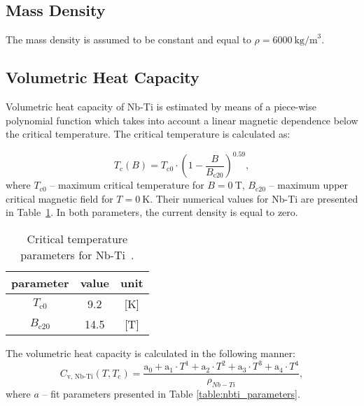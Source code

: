 
\subsection{Mass Density}
The mass density is assumed to be constant and equal to $\rho = 6000~\text{kg/m}^{3}$.

\subsection{Volumetric Heat Capacity}
Volumetric heat capacity of Nb-Ti is estimated by means of a piece-wise polynomial function which takes into account a linear magnetic dependence below the critical temperature. The critical temperature is calculated as: 

\begin{equation}
    T_\text{c}(B) = T_\text{c0}\cdot(1-\frac{B}{B_\text{c20}})^{0.59},
\end{equation}
where $T_\text{c0}$ -- maximum critical temperature for $B=0~\text{T}$, $B_\text{c20}$ -- maximum upper critical magnetic field for $T=0~\text{K}$. Their numerical values for Nb-Ti are presented in Table~\ref{table: appendix_nb_ti_crit_temp_params}. In both parameters, the current density is equal to zero. 

\newpage
\begin{table}[H]
    \caption{Critical temperature parameters for Nb-Ti~\cite{empirical_scaling_formulas_for_critical_current}.} 
    \vspace{-1.em} 
    \fontsize{10}{10}
    \selectfont 
    \renewcommand{\arraystretch}{1.5}
    \begin{center}
        \begin{tabular}{ ccc }  
        \hline
        parameter & value & unit \\
        \hline
        $T_\text{c0}$ & 9.2 & [K] \\
        $B_\text{c20}$ & 14.5 & [T] \\
        \hline 
        \end{tabular}
    \end{center}  
     \label{table: appendix_nb_ti_crit_temp_params} 
 \end{table}

The volumetric heat capacity is calculated in the following manner: 
\begin{equation}
    C_\text{v, Nb-Ti}(T, T_\text{c}) = \frac{\text{a}_0 + \text{a}_1\cdot T^{1} + \text{a}_2\cdot T^{2} + \text{a}_3\cdot T^{3}+ \text{a}_4\cdot T^{4}} {\rho_{Nb-Ti}},
\end{equation}
where $a$ -- fit parameters presented in Table \ref{table:nbti_parameters}.

